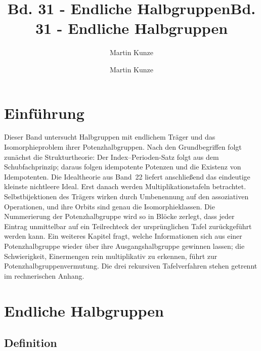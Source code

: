 \documentclass[main.tex]{subfiles}
\title{Bd. 31 - Endliche Halbgruppen}
\author{Martin Kunze}
\date{}
\begin{document}
\title{Bd. 31 - Endliche Halbgruppen}
\author{Martin Kunze}
\date{}
\hypersetup{pageanchor=false}
\maketitle
\hypersetup{pageanchor=true}
\setcounter{tocdepth}{3}
\tableofcontents
\setcounter{file}{31}
\renewcommand{\FormulaBandID}{31}

\chapter{Einführung}

Dieser Band untersucht Halbgruppen mit endlichem Träger und das
Isomorphieproblem ihrer Potenzhalbgruppen.  Nach den Grundbegriffen folgt
zunächst die Strukturtheorie: Der Index--Perioden-Satz folgt aus dem
Schubfachprinzip; daraus folgen idempotente
Potenzen und die Existenz von Idempotenten.  Die Idealtheorie aus Band~22
liefert anschließend das eindeutige kleinste nichtleere Ideal.  Erst danach
werden Multiplikationstafeln betrachtet.  Selbstbijektionen des Trägers
wirken durch Umbenennung auf den assoziativen Operationen, und ihre Orbits
sind genau die Isomorphieklassen.  Die Nummerierung der Potenzhalbgruppe wird
so in Blöcke zerlegt, dass jeder Eintrag unmittelbar auf ein Teilrechteck
der ursprünglichen Tafel zurückgeführt werden kann.  Ein weiteres Kapitel
fragt, welche Informationen sich aus einer Potenzhalbgruppe wieder über
ihre Ausgangshalbgruppe gewinnen lassen; die Schwierigkeit, Einermengen rein
multiplikativ zu erkennen, führt zur Potenzhalbgruppenvermutung.  Die drei
rekursiven Tafelverfahren stehen getrennt im rechnerischen Anhang.

\chapter{Endliche Halbgruppen}

\section{Definition}

\end{document}
